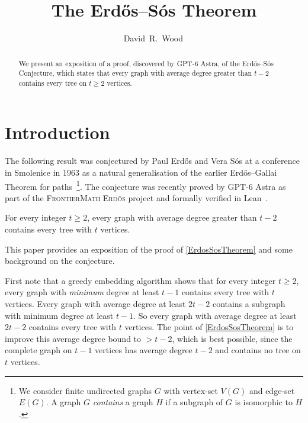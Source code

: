 \documentclass[a4paper,11pt]{article}
\renewcommand{\geq}{\geqslant}
\renewcommand{\thefootnote}{\fnsymbol{footnote}}
\begin{document}
\title{\bfseries\fontsize{18pt}{20pt}\selectfont The Erdős--Sós Theorem}

\author{David~R.~Wood\,\footnotemark[2]}

\maketitle

\begin{abstract}
We present an exposition of a proof, discovered by GPT-6 Astra, of the Erdős--Sós Conjecture, which states that every graph with average degree greater than $t-2$ contains every tree on $t\geq 2$ vertices.
\end{abstract}


\renewcommand{\thefootnote}{\arabic{footnote}}
\section{Introduction}

The following result was conjectured by Paul Erdős and Vera Sós at a conference in Smolenice in 1963 \citep{Erdos64} as a natural generalisation of the earlier Erdős--Gallai Theorem for paths~\citep{ErdosGallai59}\footnote{We consider finite undirected graphs $G$ with vertex-set $V(G)$ and edge-set $E(G)$. A graph $G$ \emph{contains} a graph $H$ if a subgraph of $G$ is isomorphic to $H$.}. The conjecture was recently proved by GPT-6 Astra \citep{ErdosSosSolution} as part of the \textsc{FrontierMath Erdős} project \citep{FrontierMathErdos} and 
formally verified in Lean~\citep{Adamczewski26}.

\begin{thm}
\label{ErdosSosTheorem}
For every integer $t\geq 2$, every graph with average degree greater than $t-2$ contains every tree with $t$ vertices. 
\end{thm}

This paper provides an exposition of the proof of \cref{ErdosSosTheorem} and some background on the conjecture. 

First note that a greedy embedding algorithm shows that for every integer $t\geq 2$, every graph with \emph{minimum} degree at least $t-1$ contains every tree with $t$ vertices.  Every graph with average degree at least $2t-2$ contains a subgraph with minimum degree at least $t-1$.   So every graph with average degree at least $2t-2$ contains every tree with $t$ vertices.  The point of \cref{ErdosSosTheorem} is to improve this average degree bound to $>t-2$, which is best possible, since the complete graph on $t-1$ vertices has average degree $t-2$ and contains no tree on $t$ vertices. 
\end{document}
